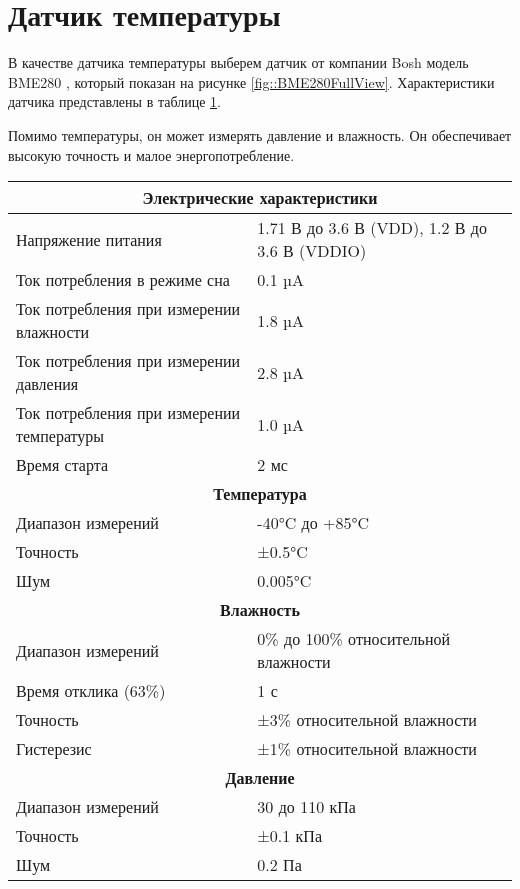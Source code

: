 \section {Датчик температуры}

В качестве датчика температуры выберем датчик от компании Bosh модель BME280 \cite{datasheet::BME280}, который показан на рисунке \ref{fig::BME280FullView}. Характеристики датчика представлены в таблице \ref{tab::TempSensorCharacteristics}.

Помимо температуры, он может измерять давление и влажность. Он обеспечивает высокую точность и малое энергопотребление. 

\begin{table}[H]
	\centering
	\caption{Характеристики датчика BME280}
	\begin{longtable}{| m{6cm} | m{10cm} |}
		\hline
		\multicolumn{2}{|c|}{\textbf{Электрические характеристики}} \\ \hline
		\endhead
		Напряжение питания & 1.71 В до 3.6 В (VDD), 1.2 В до 3.6 В (VDDIO) \\ \hline
		Ток потребления в режиме сна & 0.1 µA \\ \hline
		Ток потребления при измерении влажности & 1.8 µA \\ \hline
		Ток потребления при измерении давления & 2.8 µA \\ \hline
		Ток потребления при измерении температуры & 1.0 µA \\ \hline
		Время старта & 2 мс \\ \hline
		\multicolumn{2}{|c|}{\textbf{Температура}} \\ \hline
		Диапазон измерений & -40°C до +85°C \\ \hline
		Точность & ±0.5°C \\ \hline
		Шум & 0.005°C \\ \hline
		\multicolumn{2}{|c|}{\textbf{Влажность}} \\ \hline 
		Диапазон измерений & 0\% до 100\% относительной влажности \\ \hline
		Время отклика (63\%) & 1 с \\ \hline
		Точность & ±3\% относительной влажности \\ \hline
		Гистерезис & ±1\% относительной влажности \\ \hline
		
		\multicolumn{2}{|c|}{\textbf{Давление}} \\ \hline 
		Диапазон измерений & 30 до 110 кПа \\ \hline
		Точность & ±0.1 кПа \\ \hline
		Шум & 0.2 Па \\ \hline
		
	\end{longtable}
	\label{tab::TempSensorCharacteristics}
\end{table}

